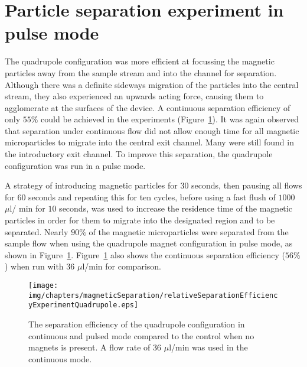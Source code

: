 
\section{Particle separation experiment in pulse mode}\label{sec:particleSeparationExperimentInPulseMode}
The quadrupole configuration was more efficient at focussing the magnetic particles away from the sample stream and into the channel for separation. Although there was a definite sideways migration of the particles into the central stream, they also experienced an upwards acting force, causing them to agglomerate at the surfaces of the device. A continuous separation efficiency of only $55\%$ could be achieved in the experiments (Figure~\ref{fig:separationEfficiencyPulseExperimentQuadrupoleConfiguration}). It was again observed that separation under continuous flow did not allow enough time for all magnetic microparticles to migrate into the central exit channel. Many were still found in the introductory exit channel. To improve this separation, the quadrupole configuration was run in a pulse mode.

A strategy of introducing magnetic particles for 30 seconds, then pausing all flows for $60$ seconds and repeating this for ten cycles, before using a fast flush of $1000$ $\mu$l/ min for $10$ seconds, was used to increase the residence time of the magnetic particles in order for them to migrate into the designated region and to be separated. Nearly $90\%$ of the magnetic microparticles were separated from the sample flow when using the quadrupole magnet configuration in pulse mode, as shown in Figure~\ref{fig:separationEfficiencyPulseExperimentQuadrupoleConfiguration}. Figure~\ref{fig:separationEfficiencyPulseExperimentQuadrupoleConfiguration} also shows the continuous separation efficiency ($56\%$) when run with $36$ $\mu$l/min for comparison.

\begin{figure}[htb]
\centering
\texttt{[image: img/chapters/magneticSeparation/relativeSeparationEfficiencyExperimentQuadrupole.eps]}
\caption[Particle separation efficiency of the quadrupole configuration in pulse mode]{The separation efficiency of the quadrupole configuration in continuous and pulsed mode compared to the control when no magnets is present. A flow rate of $36$ $\mu$l/min was used in the continuous mode.}
\label{fig:separationEfficiencyPulseExperimentQuadrupoleConfiguration}
\end{figure}

